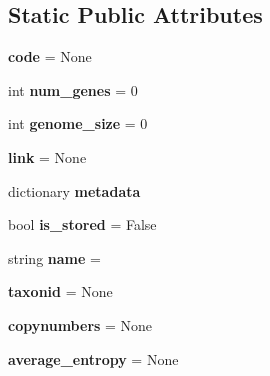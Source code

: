 \subsection*{Static Public Attributes}
\begin{DoxyCompactItemize}
\item 
\mbox{\label{class_py_c_u_b_1_1espece_1_1_espece_a143141fe25ea32dc24abd314a0f5fdbd}} 
{\bfseries code} = None
\item 
\mbox{\label{class_py_c_u_b_1_1espece_1_1_espece_ac3d8e577f2e9a0fe6853d51c4bec238d}} 
int {\bfseries num\+\_\+genes} = 0
\item 
\mbox{\label{class_py_c_u_b_1_1espece_1_1_espece_a87ca67e0c2e560e88b72a8bdba456756}} 
int {\bfseries genome\+\_\+size} = 0
\item 
\mbox{\label{class_py_c_u_b_1_1espece_1_1_espece_ae066a956b3f9f29d676162fbf9773a0f}} 
{\bfseries link} = None
\item 
dictionary {\bfseries metadata}
\item 
\mbox{\label{class_py_c_u_b_1_1espece_1_1_espece_a8befee83c9b6ecfc8b07e66b6251afa4}} 
bool {\bfseries is\+\_\+stored} = False
\item 
\mbox{\label{class_py_c_u_b_1_1espece_1_1_espece_accf54132a0346377a2cf7a461a129dc1}} 
string {\bfseries name} = \textquotesingle{}\textquotesingle{}
\item 
\mbox{\label{class_py_c_u_b_1_1espece_1_1_espece_aae7cf0e3c6f359bd2970006817e80ed3}} 
{\bfseries taxonid} = None
\item 
\mbox{\label{class_py_c_u_b_1_1espece_1_1_espece_a89cd4e211bf028a4d141202e8a885b58}} 
{\bfseries copynumbers} = None
\item 
\mbox{\label{class_py_c_u_b_1_1espece_1_1_espece_a2dc4b3f0d2006aac69a9846ba834d209}} 
{\bfseries average\+\_\+entropy} = None

\end{DoxyCompactItemize}
